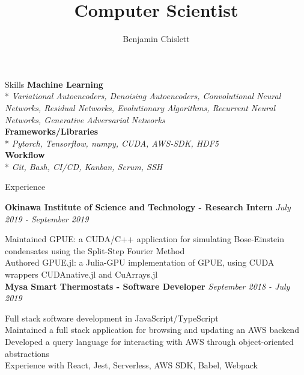 \documentclass[11pt, letterpaper]{article}
\title{Computer Scientist}
\author{Benjamin Chislett}
\date{}
\begin{document}
\begin{center}
  \Huge\theauthor
  \par
  \huge\thetitle
  \par
\end{center}

\begin{section}{Skills}
\textbf{Machine Learning}\\*
\textit{Variational Autoencoders, Denoising Autoencoders, Convolutional Neural Networks, Residual Networks, Evolutionary Algorithms, Recurrent Neural Networks, Generative Adversarial Networks}\\

\textbf{Frameworks/Libraries}\\*
\textit{Pytorch, Tensorflow, numpy, CUDA, AWS-SDK, HDF5}\\

\textbf{Workflow}\\*
\textit{Git, Bash, CI/CD, Kanban, Scrum, SSH}
\end{section}

\begin{section}{Experience}

\textbf{Okinawa Institute of Science and Technology - Research Intern}
\hfill
\textit{July 2019 - September 2019}

Maintained GPUE: a CUDA/C++ application for simulating Bose-Einstein condensates using the Split-Step Fourier Method\\
Authored GPUE.jl: a Julia-GPU implementation of GPUE, using CUDA wrappers CUDAnative.jl and CuArrays.jl\\

\textbf{Mysa Smart Thermostats - Software Developer}
\hfill
\textit{September 2018 - July 2019}

Full stack software development in JavaScript/TypeScript\\
Maintained a full stack application for browsing and updating an AWS backend\\
Developed a query language for interacting with AWS through object-oriented abstractions\\
Experience with React, Jest, Serverless, AWS SDK, Babel, Webpack
\end{section}
\end{document}
